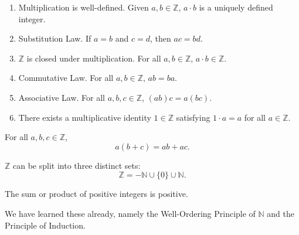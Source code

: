 \begin{definition}
    \begin{enumerate}
        \item Multiplication is well-defined.
        Given $a,b \in \mathbb{Z}$, $a \cdot b$ is a uniquely defined integer.

        \item Substitution Law.
        If $a = b$ and $c = d$, then $ac = bd$.

        \item $\mathbb{Z}$ is closed under multiplication.
        For all $a,b \in \mathbb{Z}$, $a \cdot b \in \mathbb{Z}$.

        \item Commutative Law.
        For all $a,b \in \mathbb{Z}$, $ab = ba$.

        \item Associative Law.
        For all $a,b,c \in \mathbb{Z}$, $(ab)c = a(bc)$.

        \item There exists a multiplicative identity $1 \in \mathbb{Z}$ satisfying $1 \cdot a = a$ for all $a \in \mathbb{Z}$.
    \end{enumerate}
\end{definition}

\begin{definition}
    For all $a,b,c \in \mathbb{Z}$,
    \[
        a(b + c) = ab + ac.
    \]
\end{definition}

\begin{definition}
    $\mathbb{Z}$ can be split into three distinct sets:
    \[
        \mathbb{Z} = -\mathbb{N} \cup \{0\} \cup \mathbb{N}.
    \]
\end{definition}

\begin{definition}
    The sum or product of positive integers is positive.
\end{definition}

\begin{definition}
    We have learned these already, namely the Well-Ordering Principle of $\mathbb{N}$ and the Principle of Induction.
\end{definition}